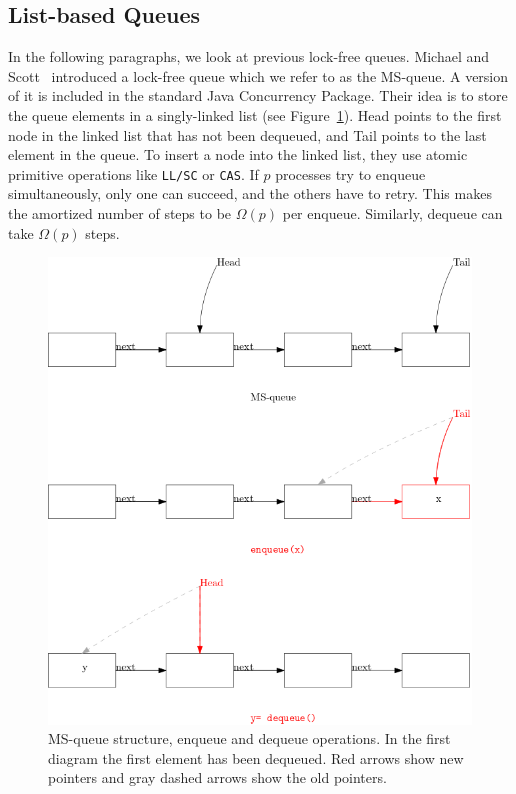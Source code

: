 \documentclass[12pt]{article}
\begin{document}
\subsection{List-based Queues}
In the following paragraphs, we look at previous lock-free queues.
Michael and Scott~\cite{DBLP:conf/podc/MichaelS96} introduced a lock-free queue which we refer to as the MS-queue. A version of it is included in the standard Java Concurrency Package. Their idea is to store the queue elements in a singly-linked list (see Figure~\ref{fig::msq}). Head points to the first node in the linked list that has not been dequeued, and Tail points to the last element in the queue. To insert a node into the linked list, they use atomic primitive operations like \texttt{LL/SC} or \texttt{CAS}. If $p$ processes try to enqueue simultaneously, only one can succeed, and the others have to retry. This makes the amortized number of steps to be $\Omega(p)$ per enqueue. Similarly, dequeue can take $\Omega(p)$ steps.

\begin{figure}[hbt]
  \center\includegraphics[scale=0.4]{pics/msqueue}
  \caption{\label{fig::msq}MS-queue structure, enqueue and dequeue operations. In the first diagram the first element has been dequeued. Red arrows show new pointers and gray dashed arrows show the old pointers.}
\end{figure}
\end{document}

